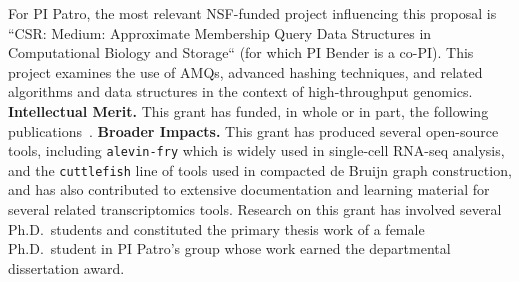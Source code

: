 For PI Patro, the most relevant NSF-funded project influencing this proposal is ``CSR: Medium: Approximate Membership Query Data Structures in Computational Biology and Storage`` (for which PI Bender is a co-PI).  This project examines the use of AMQs, advanced hashing techniques, and related algorithms and data structures in the context of high-throughput genomics.
\textbf{Intellectual Merit.} This grant has funded, in whole or in part, the following publications~\cite{Khan2021,Khan2022,Khan2023CapsSA,Almodaresi2021,almodaresi2022incrementally,he2022alevin,Srivastava2019,fan2023fulgor,fan2023spt,skoufos2022agamemnon,singh2023treeterminus,He2023,Pibiri2023MacDBG,wu2023seesaw,Karami2023,He2023Ambiguity,Fan2022Perplexity,Mu2022Airpart,AlmodaresiPFJP19,Soneson2021,Srivastava2020AlnMap,Srivastava2020BayesianSharing,Sarkar2020Terminus,Love2020Tximeta,Marais2019Sketching,VandenBerge2019,Zhu2019,Zakeri2021LikeForLike,Sarkar2019Minnow,VanBuren2021}.
\textbf{Broader Impacts.} This grant has produced several open-source tools, including \texttt{alevin-fry} which is widely used in single-cell RNA-seq analysis, and the \texttt{cuttlefish} line of tools used in compacted de Bruijn graph construction, and has also contributed to extensive documentation and learning material for several related transcriptomics tools. Research on this grant has involved several Ph.D.\ students and constituted the primary thesis work of a female Ph.D.\ student in PI Patro's group whose work earned the departmental dissertation award. 